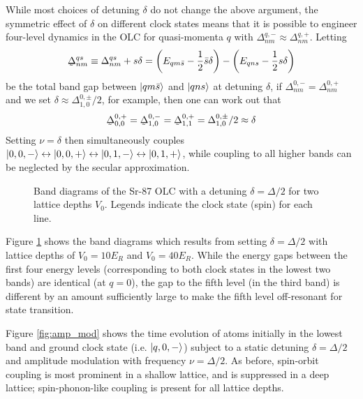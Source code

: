 \documentclass[aps,notitlepage,nofootinbib,11pt]{revtex4-1}
\newcommand{\f}[2]{\dfrac{#1}{#2}} %
\newcommand{\p}[1]{\left(#1\right)} %
\newcommand{\1}{\mathds{1}}
\newcommand{\utilde}[1]{\underaccent{\tilde}{#1}}
\begin{document}
While most choices of detuning $\delta$ do not change the above
argument, the symmetric effect of $\delta$ on different clock states
means that it is possible to engineer four-level dynamics in the OLC
for quasi-momenta $q$ with
$\Delta^{q,-}_{nm}\approx\Delta^{q,+}_{nm}$. Letting
\begin{align}
  \utilde\Delta^{qs}_{nm}
  \equiv \Delta^{qs}_{nm} + s\delta
  = \p{E_{qm\bar s} - \f12\bar s\delta} - \p{E_{qns} - \f12s\delta}
\end{align}
be the total band gap between $\ket{qm\bar s}$ and $\ket{qns}$ at
detuning $\delta$, if $\Delta^{0,-}_{nm}=\Delta^{0,+}_{nm}$ and we set
$\delta\approx\Delta^{0,\pm}_{1,0}/2$, for example, then one can work
out that
\begin{align}
  \utilde\Delta^{0,+}_{0,0}
  = \utilde\Delta^{0,-}_{1,0}
  = \utilde\Delta^{0,+}_{1,1}
  = \Delta^{0,\pm}_{1,0}/2
  \approx \delta
  \label{eq:gaps}
\end{align}
Setting $\nu=\delta$ then simultaneously couples
$\ket{0,0,-}\leftrightarrow\ket{0,0,+}
\leftrightarrow\ket{0,1,-}\leftrightarrow\ket{0,1,+}$, while coupling
to all higher bands can be neglected by the secular approximation.

\begin{figure}
  \captionsetup[subfloat]{farskip=1pt,captionskip=1pt}
   
  \caption{Band diagrams of the Sr-87 OLC with a detuning
    $\delta=\Delta/2$ for two lattice depths $V_0$.  Legends indicate
    the clock state (spin) for each line.}
  \label{fig:bands_detuned}
\end{figure}

Figure \ref{fig:bands_detuned} shows the band diagrams which results
from setting $\delta=\Delta/2$ with lattice depths of $V_0=10E_R$ and
$V_0=40E_R$. While the energy gaps between the first four energy
levels (corresponding to both clock states in the lowest two bands)
are identical (at $q=0$), the gap to the fifth level (in the third
band) is different by an amount sufficiently large to make the fifth
level off-resonant for state transition.

Figure \ref{fig:amp_mod} shows the time evolution of atoms initially
in the lowest band and ground clock state (i.e. $\ket{q,0,-}$) subject
to a static detuning $\delta=\Delta/2$ and amplitude modulation with
frequency $\nu=\Delta/2$. As before, spin-orbit coupling is most
prominent in a shallow lattice, and is suppressed in a deep lattice;
spin-phonon-like coupling is present for all lattice depths.
\end{document}
